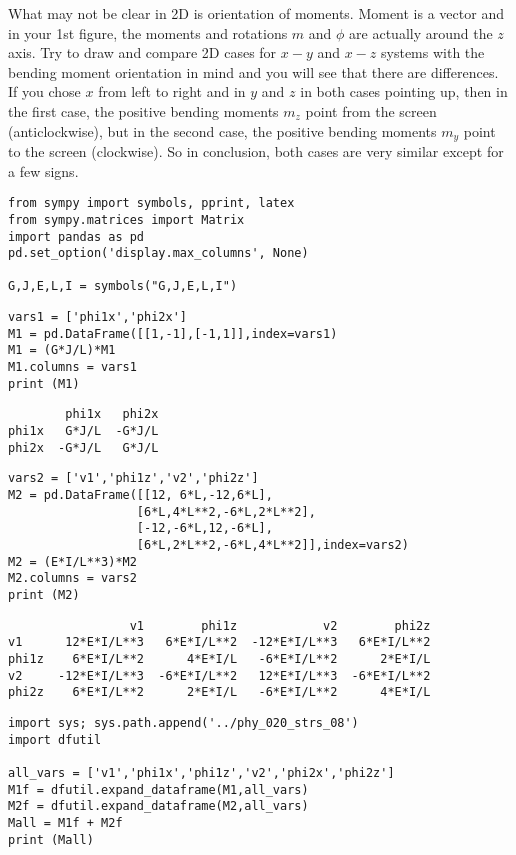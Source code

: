 \documentclass[12pt,fleqn]{article}\usepackage{../../common}
\begin{document}


What may not be clear in 2D is orientation of moments. Moment is a vector and in
your 1st figure, the moments and rotations $m$ and $\phi$ are actually around
the $z$ axis. Try to draw and compare 2D cases for $x-y$ and $x-z$ systems with
the bending moment orientation in mind and you will see that there are
differences. If you chose $x$ from left to right and in $y$ and $z$ in both
cases pointing up, then in the first case, the positive bending moments $m_z$
point from the screen (anticlockwise), but in the second case, the positive
bending moments $m_y$ point to the screen (clockwise). So in conclusion, both
cases are very similar except for a few signs.

\begin{verbatim}
from sympy import symbols, pprint, latex
from sympy.matrices import Matrix
import pandas as pd
pd.set_option('display.max_columns', None)

G,J,E,L,I = symbols("G,J,E,L,I")
\end{verbatim}

\begin{verbatim}
vars1 = ['phi1x','phi2x']
M1 = pd.DataFrame([[1,-1],[-1,1]],index=vars1)
M1 = (G*J/L)*M1
M1.columns = vars1
print (M1)
\end{verbatim}

\begin{verbatim}
        phi1x   phi2x
phi1x   G*J/L  -G*J/L
phi2x  -G*J/L   G*J/L
\end{verbatim}

\begin{verbatim}
vars2 = ['v1','phi1z','v2','phi2z']
M2 = pd.DataFrame([[12, 6*L,-12,6*L],
                  [6*L,4*L**2,-6*L,2*L**2],
                  [-12,-6*L,12,-6*L],
                  [6*L,2*L**2,-6*L,4*L**2]],index=vars2)
M2 = (E*I/L**3)*M2
M2.columns = vars2
print (M2)
\end{verbatim}

\begin{verbatim}
                 v1        phi1z            v2        phi2z
v1      12*E*I/L**3   6*E*I/L**2  -12*E*I/L**3   6*E*I/L**2
phi1z    6*E*I/L**2      4*E*I/L   -6*E*I/L**2      2*E*I/L
v2     -12*E*I/L**3  -6*E*I/L**2   12*E*I/L**3  -6*E*I/L**2
phi2z    6*E*I/L**2      2*E*I/L   -6*E*I/L**2      4*E*I/L
\end{verbatim}

\begin{verbatim}
import sys; sys.path.append('../phy_020_strs_08')
import dfutil

all_vars = ['v1','phi1x','phi1z','v2','phi2x','phi2z']
M1f = dfutil.expand_dataframe(M1,all_vars)
M2f = dfutil.expand_dataframe(M2,all_vars)
Mall = M1f + M2f
print (Mall)
\end{verbatim}
\end{document}
